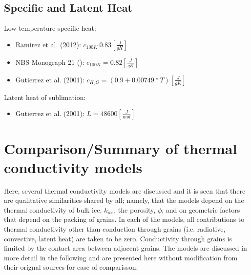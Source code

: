 \documentclass[11pt]{article} %
\begin{document}
\subsection{Specific  and Latent Heat}
\label{sec:sheat}

	Low temperature specific heat:
	
	\begin{itemize}
	\item Ramirez et al. (2012): $c_{100 K} ~ 0.83 [\frac{J}{g K}]$
	\item NBS Monograph 21 (): $c_{100 K} = 0.82 [\frac{J}{g K}]$
	\item Gutierrez et al. (2001): $c_{H_{2}O} = (0.9 + 0.00749 * T) [\frac{J}{g K}]$
	\end{itemize}
	
	Latent heat of sublimation:
	
	\begin{itemize}
	\item Gutierrez et al. (2001): $L = 48600 [\frac{J}{mol}]$
	\end{itemize}
	
\section{Comparison/Summary of thermal conductivity models}

	Here, several thermal conductivity models are discussed and it is seen that there are qualitative similarities shared by all; namely, that the models depend on the thermal conductivity of bulk ice, $k_{ice}$, the porosity, $\phi$, and on geometric factors that depend on the packing of grains. In each of the models, all contributions to thermal conductivity  other than conduction through grains (i.e. radiative, convective, latent heat) are taken to be zero. Conductivity through grains is limited by the contact area between adjacent grains. The models are discussed in more detail in the following and are presented here without modification from their orignal sources for ease of comparisson.
	
\end{document}
